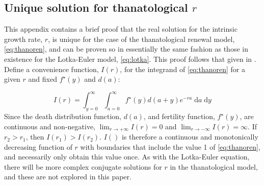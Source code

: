 \documentclass{article}
\newcommand{\dd}{\; \mathrm{d}}
\begin{document}
\vspace{2em}

\begin{appendices}
\section{Unique solution for thanatological $r$}
\label{app:A}
This appendix contains a brief proof that the real solution for the
intrinsic growth rate, $r$, is unique for the case of the thanatological renewal model, \eqref{eq:thanoren}, and can be proven so in
essentially the same fashion as those in existence for the Lotka-Euler model,
\eqref{eq:lotka}. This proof follows that given in
\citet{pressat1973analyse}. Define a convenience function, $I(r)$, for the
integrand of \eqref{eq:thanoren} for a given $r$ and fixed $f^\star(y)$ and $d(a)$:

\begin{equation}
I(r) = \int_{y=0}^\infty \int_{a=0}^\infty f^\star(y) d(a+y)e^{-ra}\dd a \dd y
\end{equation}
Since the death distribution function, $d(a)$, and fertility
function, $f^\star(y)$, are continuous and non-negative, $\lim_{r \to +\infty} I(r)
= 0$ and $\lim_{r \to -\infty} I(r)= \infty$. If $r_2 > r_1$, then $I(r_1) >
I(r_2)$. $I()$ is therefore a continuous and monotonically decreasing function
of $r$ with boundaries that include the value 1 of \eqref{eq:thanoren}, and
 necessarily only obtain this value once. As with the Lotka-Euler equation, there will be more complex
 conjugate solutions for $r$ in the thanatological model,
 and these are not explored in this paper.



\end{appendices}
\end{document}
